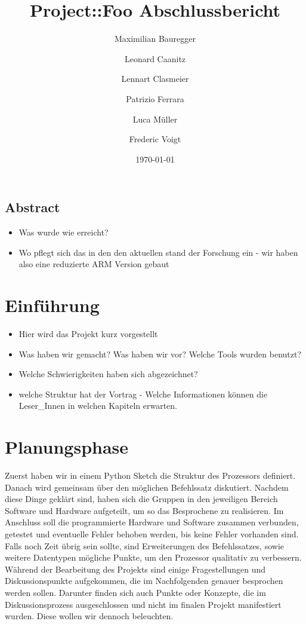 \documentclass[paper=a4,fontsize=12pt,twocolumn]{scrreprt}
\title{Project::Foo Abschlussbericht}
\author{Maximilian Bauregger \and Leonard Caanitz \and Lennart Clasmeier \and Patrizio Ferrara \and Luca Müller \and Frederic Voigt}
\date{\today}
\begin{document}
\maketitle

\tableofcontents

\section*{Abstract}

\begin{itemize}
    \item Was wurde wie erreicht?
    \item Wo pflegt sich das in den den aktuellen stand der Forschung ein - wir haben also eine reduzierte ARM Version gebaut
\end{itemize}
\kant[1]


\chapter{Einführung}
\begin{itemize}
    \item Hier wird das Projekt kurz vorgestellt
    \item Was haben wir gemacht? Was haben wir vor? Welche Tools wurden benutzt?
    \item Welche Schwierigkeiten haben sich abgezeichnet?
    \item welche Struktur hat der Vortrag - Welche Informationen können die Leser\_Innen in welchen Kapiteln erwarten.
\end{itemize}
\kant[2-3]

\chapter{Planungsphase}

Zuerst haben wir in einem Python Sketch die Struktur des Prozessors definiert.
Danach wird gemeinsam über den möglichen Befehlssatz diskutiert.
Nachdem diese Dinge geklärt sind, haben sich die Gruppen in den jeweiligen Bereich Software und Hardware aufgeteilt, um so das Besprochene zu realisieren.
Im Anschluss soll die programmierte Hardware und Software zusammen verbunden, getestet und eventuelle Fehler behoben werden, bis keine Fehler vorhanden sind.
Falls noch Zeit übrig sein sollte, sind Erweiterungen des Befehlssatzes, sowie weitere Datentypen mögliche Punkte, um den Prozessor qualitativ zu verbessern.
Während der Bearbeitung des Projekts sind einige Fragestellungen und Diskussionspunkte aufgekommen, die im Nachfolgenden genauer besprochen werden sollen. Darunter finden sich auch Punkte oder Konzepte, die im Diskussionsprozess ausgeschlossen und nicht im finalen Projekt manifestiert wurden. Diese wollen wir dennoch beleuchten.
\end{document}
